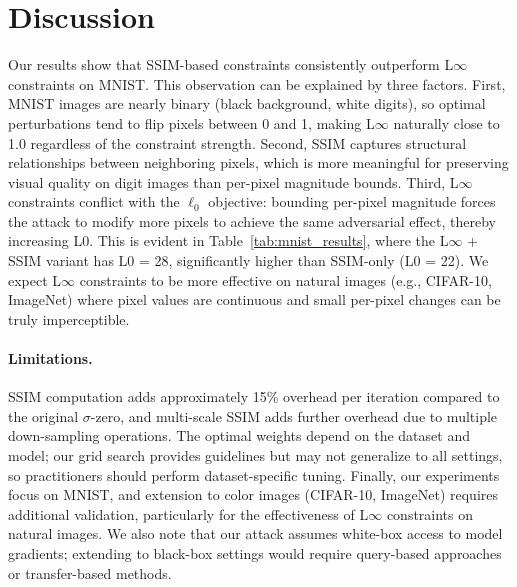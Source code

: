 \section{Discussion}
\label{sec:discussion}

Our results show that SSIM-based constraints consistently outperform L$\infty$ constraints on MNIST. This observation can be explained by three factors. First, MNIST images are nearly binary (black background, white digits), so optimal perturbations tend to flip pixels between 0 and 1, making L$\infty$ naturally close to 1.0 regardless of the constraint strength. Second, SSIM captures structural relationships between neighboring pixels, which is more meaningful for preserving visual quality on digit images than per-pixel magnitude bounds. Third, L$\infty$ constraints conflict with the $\ell_0$ objective: bounding per-pixel magnitude forces the attack to modify more pixels to achieve the same adversarial effect, thereby increasing L0. This is evident in Table~\ref{tab:mnist_results}, where the L$\infty$ + SSIM variant has L0 = 28, significantly higher than SSIM-only (L0 = 22). We expect L$\infty$ constraints to be more effective on natural images (e.g., CIFAR-10, ImageNet) where pixel values are continuous and small per-pixel changes can be truly imperceptible.

\paragraph{Limitations.} SSIM computation adds approximately 15\% overhead per iteration compared to the original $\sigma$-zero, and multi-scale SSIM adds further overhead due to multiple down-sampling operations. The optimal weights depend on the dataset and model; our grid search provides guidelines but may not generalize to all settings, so practitioners should perform dataset-specific tuning. Finally, our experiments focus on MNIST, and extension to color images (CIFAR-10, ImageNet) requires additional validation, particularly for the effectiveness of L$\infty$ constraints on natural images. We also note that our attack assumes white-box access to model gradients; extending to black-box settings would require query-based approaches~\cite{guo2019simple, brendel2019decision} or transfer-based methods.


